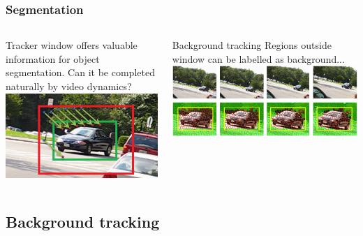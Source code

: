 \documentclass{beamer}
\begin{document}
\begin{frame}
	\frametitle{Segmentation}
  \begin{columns}[T]
    \begin{column}{.33\textwidth}

Tracker window offers valuable information for object segmentation. Can it be completed naturally by video dynamics?		\includegraphics[width=1.0\textwidth]{../images/tracking_points.png}

    \end{column}	
    \begin{column}{.66\textwidth}
		\begin{block}{Background tracking} 
	Regions outside window can be labelled as background...	\includegraphics[width=1.0\textwidth]{../images/suppixflow2.png}
		\end{block}
    \end{column}	
    
  \end{columns}  
\end{frame}


\subsection{Background tracking}
\end{document}
